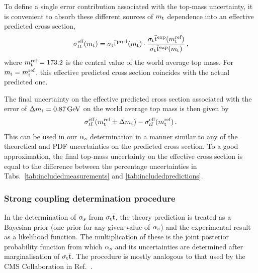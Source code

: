 To define a single error contribution associated with the
top-mass uncertainty, it is convenient to absorb these different
sources of $m_\mathrm{t}$ dependence into an effective predicted cross section,
\begin{equation}
  \label{eq:eff-mtop-dep}
\sigma_{t\bar{t}}^{\text{eff}}(m_\mathrm{t}) = 
    \sigma_\mathrm{t}\bar{\mathrm{t}}^{\text{pred}} (  m_\mathrm{t}  ) \cdot 
        \frac{
            \sigma_\mathrm{t}\bar{\mathrm{t}}^{\text{exp}} (  m_\mathrm{t}^{\text{ref}}  )
            }{
            \sigma_\mathrm{t}\bar{\mathrm{t}}^{\text{exp}} (  m_\mathrm{t}  )
            }\,,
\end{equation}
where $m_\mathrm{t}^{\text{ref}} = 173.2$ is the central value of the world average top
mass.
%
For $m_\mathrm{t} = m_\mathrm{t}^{\text{ref}}$, this effective predicted cross section coincides
with the actual predicted one.

The final uncertainty on the effective predicted cross section
associated with the error of $\Delta m_\mathrm{t} = 0.87\,\text{GeV}$ on the world
average top mass is then given by
\begin{equation}
  \label{eq:mtop-uncertainty-impact}
  \sigma_{t\bar{t}}^{\text{eff}}(m_\mathrm{t}^{\text{ref}} \pm \Delta m_\mathrm{t}) - 
  \sigma_{t\bar{t}}^{\text{eff}}(m_\mathrm{t}^{\text{ref}})\,.
\end{equation}
This can be used in our $\alpha_s$ determination in a manner similar to
any of the theoretical and PDF uncertainties on the predicted cross
section.
% 
To a good approximation, the final top-mass uncertainty on the
effective cross section is equal to the difference between the
percentage uncertainties in Tabs.~\ref{tab:includedmeasurements} and
\ref{tab:includedpredictions}.
%

\subsubsection{Strong coupling determination procedure}
\label{sec:determination-procedure}

In the determination of $\alpha_s$ from $\sigma_\mathrm{t}\bar{\mathrm{t}}$, the theory prediction is
treated as a Bayesian prior (one prior for any given value of $\alpha_s$)
and the experimental result as a likelihood function.  The
multiplication of these is the joint posterior probability function
from which $\alpha_s$ and its uncertainties are determined after
marginalisation of $\sigma_\mathrm{t}\bar{\mathrm{t}}$.  The procedure is mostly analogous to that
used by the CMS Collaboration in Ref.~\cite{CMS-ttbar-alphas}.

